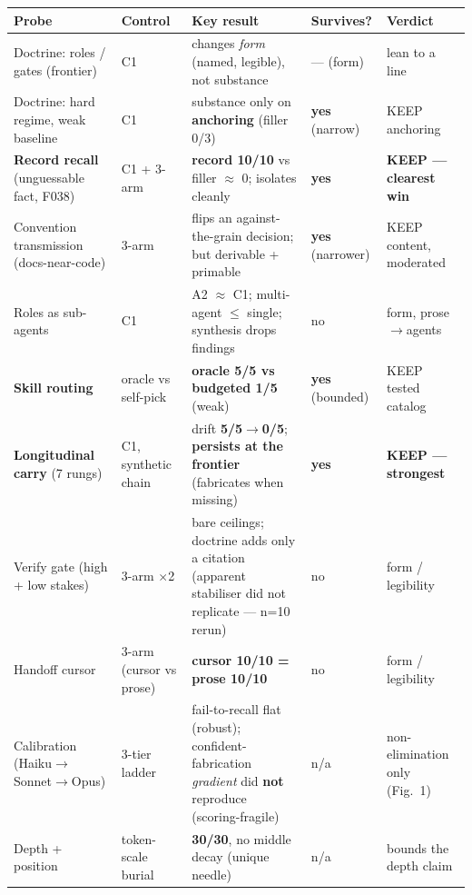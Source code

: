 \documentclass[11pt]{article}
\begin{document}
\begin{table}[ht]
\centering
\footnotesize
\begin{tabular}{L{3.1cm} L{1.9cm} L{4.8cm} L{1.7cm} L{2.4cm}}
\toprule
Probe & Control & Key result & Survives? & Verdict \\
\midrule
Doctrine: roles / gates (frontier) & C1 & changes \emph{form} (named, legible), not substance & --- (form) & lean to a line \\
Doctrine: hard regime, weak baseline & C1 & substance only on \textbf{anchoring} (filler 0/3) & \textbf{yes} (narrow) & KEEP anchoring \\
\textbf{Record recall} (unguessable fact, F038) & C1 + 3-arm & \textbf{record 10/10} vs filler $\approx$ 0; isolates cleanly & \textbf{yes} & \textbf{KEEP --- clearest win} \\
Convention transmission (docs-near-code) & 3-arm & flips an against-the-grain decision; but derivable + primable & \textbf{yes} (narrower) & KEEP content, moderated \\
Roles as sub-agents & C1 & A2 $\approx$ C1; multi-agent $\leq$ single; synthesis drops findings & no & form, prose$\rightarrow$agents \\
\textbf{Skill routing} & oracle vs self-pick & \textbf{oracle 5/5 vs budgeted 1/5} (weak) & \textbf{yes} (bounded) & KEEP tested catalog \\
\textbf{Longitudinal carry} (7 rungs) & C1, synthetic chain & drift \textbf{5/5$\rightarrow$0/5}; \textbf{persists at the frontier} (fabricates when missing) & \textbf{yes} & \textbf{KEEP --- strongest} \\
Verify gate (high + low stakes) & 3-arm $\times$2 & bare ceilings; doctrine adds only a citation (apparent stabiliser did not replicate --- n=10 rerun) & no & form / legibility \\
Handoff cursor & 3-arm (cursor vs prose) & \textbf{cursor 10/10 = prose 10/10} & no & form / legibility \\
Calibration (Haiku$\rightarrow$Sonnet$\rightarrow$Opus) & 3-tier ladder & fail-to-recall flat (robust); confident-fabrication \emph{gradient} did \textbf{not} reproduce (scoring-fragile) & n/a & non-elimination only (Fig.~1) \\
Depth + position & token-scale burial & \textbf{30/30}, no middle decay (unique needle) & n/a & bounds the depth claim \\
\bottomrule
\end{tabular}
\end{table}
\end{document}
